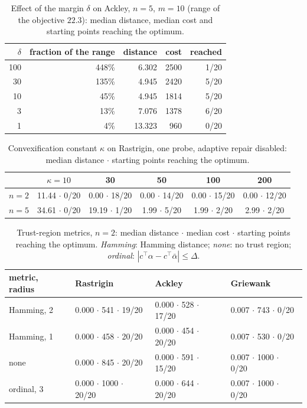 \documentclass[pdflatex,sn-basic]{sn-jnl}
\newenvironment{appendices}{\appendix}{}
\begin{document}
\begin{appendices}
\begin{table}[h]
  \centering
  \caption{Effect of the margin $\delta$ on Ackley, $n = 5$, $m = 10$ (range of
    the objective $22.3$): median distance, median cost and starting points
    reaching the optimum.}
  \label{tab:margin-ackley}
  \small
  \begin{tabular}{rrrrr}
    \toprule
    $\delta$ & fraction of the range & distance & cost & reached \\
    \midrule
    100 & 448\% & 6.302  & 2500 & 1/20 \\
    30  & 135\% & 4.945  & 2420 & 5/20 \\
    10  & 45\%  & 4.945  & 1814 & 5/20 \\
    3   & 13\%  & 7.076  & 1378 & 6/20 \\
    1   & 4\%   & 13.323 & 960  & 0/20 \\
    \bottomrule
  \end{tabular}
\end{table}

\begin{table}[h]
  \centering
  \caption{Convexification constant $\kappa$ on Rastrigin, one probe, adaptive
    repair disabled: median distance $\cdot$ starting points reaching the
    optimum.}
  \label{tab:constant}
  \small
  \begin{tabular}{lccccc}
    \toprule
    & $\kappa = 10$ & 30 & 50 & 100 & 200 \\
    \midrule
    $n=2$ & 11.44 $\cdot$ 0/20 & 0.00 $\cdot$ 18/20 & 0.00 $\cdot$ 14/20 & 0.00 $\cdot$ 15/20 & 0.00 $\cdot$ 12/20 \\
    $n=5$ & 34.61 $\cdot$ 0/20 & 19.19 $\cdot$ 1/20 & 1.99 $\cdot$ 5/20  & 1.99 $\cdot$ 2/20  & 2.99 $\cdot$ 2/20 \\
    \bottomrule
  \end{tabular}
\end{table}

\begin{table}[h]
  \centering
  \caption{Trust-region metrics, $n = 2$: median distance $\cdot$ median cost
    $\cdot$ starting points reaching the optimum. \emph{Hamming}: Hamming
    distance; \emph{none}: no trust region; \emph{ordinal}:
    $|c^\top\alpha - c^\top\bar\alpha| \le \Delta$.}
  \label{tab:metric}
  \small
  \begin{tabular}{llll}
    \toprule
    metric, radius & Rastrigin & Ackley & Griewank \\
    \midrule
    Hamming, 2    & 0.000 $\cdot$ 541 $\cdot$ 19/20  & 0.000 $\cdot$ 528 $\cdot$ 17/20 & 0.007 $\cdot$ 743 $\cdot$ 0/20 \\
    Hamming, 1    & 0.000 $\cdot$ 458 $\cdot$ 20/20  & 0.000 $\cdot$ 454 $\cdot$ 20/20 & 0.007 $\cdot$ 530 $\cdot$ 0/20 \\
    none          & 0.000 $\cdot$ 845 $\cdot$ 20/20  & 0.000 $\cdot$ 591 $\cdot$ 15/20 & 0.007 $\cdot$ 1000 $\cdot$ 0/20 \\
    ordinal, 3    & 0.000 $\cdot$ 1000 $\cdot$ 20/20 & 0.000 $\cdot$ 644 $\cdot$ 20/20 & 0.007 $\cdot$ 1000 $\cdot$ 0/20 \\
    \bottomrule
  \end{tabular}
\end{table}


\end{appendices}
\end{document}
